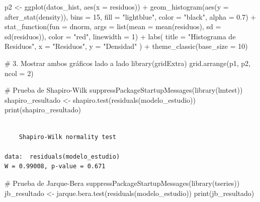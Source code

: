 \documentclass[
  letterpaper,
  DIV=11,
  numbers=noendperiod]{scrreprt}
\newenvironment{Shaded}{\begin{snugshade}}{\end{snugshade}}
\newcommand{\AttributeTok}[1]{\textcolor[rgb]{0.40,0.45,0.13}{#1}}
\newcommand{\CommentTok}[1]{\textcolor[rgb]{0.37,0.37,0.37}{#1}}
\newcommand{\DecValTok}[1]{\textcolor[rgb]{0.68,0.00,0.00}{#1}}
\newcommand{\FloatTok}[1]{\textcolor[rgb]{0.68,0.00,0.00}{#1}}
\newcommand{\FunctionTok}[1]{\textcolor[rgb]{0.28,0.35,0.67}{#1}}
\newcommand{\NormalTok}[1]{\textcolor[rgb]{0.00,0.23,0.31}{#1}}
\newcommand{\OtherTok}[1]{\textcolor[rgb]{0.00,0.23,0.31}{#1}}
\newcommand{\SpecialCharTok}[1]{\textcolor[rgb]{0.37,0.37,0.37}{#1}}
\newcommand{\StringTok}[1]{\textcolor[rgb]{0.13,0.47,0.30}{#1}}
\begin{document}
\begin{tcolorbox}
\begin{Shaded}
\begin{Highlighting}[]
\NormalTok{p2 }\OtherTok{\textless{}{-}} \FunctionTok{ggplot}\NormalTok{(datos\_hist, }\FunctionTok{aes}\NormalTok{(}\AttributeTok{x =}\NormalTok{ residuos)) }\SpecialCharTok{+}
  \FunctionTok{geom\_histogram}\NormalTok{(}\FunctionTok{aes}\NormalTok{(}\AttributeTok{y =} \FunctionTok{after\_stat}\NormalTok{(density)), }\AttributeTok{bins =} \DecValTok{15}\NormalTok{, }\AttributeTok{fill =} \StringTok{"lightblue"}\NormalTok{, }
                 \AttributeTok{color =} \StringTok{"black"}\NormalTok{, }\AttributeTok{alpha =} \FloatTok{0.7}\NormalTok{) }\SpecialCharTok{+}
  \FunctionTok{stat\_function}\NormalTok{(}\AttributeTok{fun =}\NormalTok{ dnorm, }
                \AttributeTok{args =} \FunctionTok{list}\NormalTok{(}\AttributeTok{mean =} \FunctionTok{mean}\NormalTok{(residuos), }\AttributeTok{sd =} \FunctionTok{sd}\NormalTok{(residuos)),}
                \AttributeTok{color =} \StringTok{"red"}\NormalTok{, }\AttributeTok{linewidth =} \DecValTok{1}\NormalTok{) }\SpecialCharTok{+}
  \FunctionTok{labs}\NormalTok{(}
    \AttributeTok{title =} \StringTok{"Histograma de Residuos"}\NormalTok{,}
    \AttributeTok{x =} \StringTok{"Residuos"}\NormalTok{,}
    \AttributeTok{y =} \StringTok{"Densidad"}
\NormalTok{  ) }\SpecialCharTok{+}
  \FunctionTok{theme\_classic}\NormalTok{(}\AttributeTok{base\_size =} \DecValTok{10}\NormalTok{)}

\CommentTok{\# 3. Mostrar ambos gráficos lado a lado}
\FunctionTok{library}\NormalTok{(gridExtra)}
\FunctionTok{grid.arrange}\NormalTok{(p1, p2, }\AttributeTok{ncol =} \DecValTok{2}\NormalTok{)}

\CommentTok{\# Prueba de Shapiro{-}Wilk}
\FunctionTok{suppressPackageStartupMessages}\NormalTok{(}\FunctionTok{library}\NormalTok{(lmtest))}
\NormalTok{shapiro\_resultado }\OtherTok{\textless{}{-}} \FunctionTok{shapiro.test}\NormalTok{(}\FunctionTok{residuals}\NormalTok{(modelo\_estudio))}
\FunctionTok{print}\NormalTok{(shapiro\_resultado)}
\end{Highlighting}
\end{Shaded}

\begin{verbatim}

    Shapiro-Wilk normality test

data:  residuals(modelo_estudio)
W = 0.99008, p-value = 0.671
\end{verbatim}

\begin{Shaded}
\begin{Highlighting}[]
\CommentTok{\# Prueba de Jarque{-}Bera}
\FunctionTok{suppressPackageStartupMessages}\NormalTok{(}\FunctionTok{library}\NormalTok{(tseries))}
\NormalTok{jb\_resultado }\OtherTok{\textless{}{-}} \FunctionTok{jarque.bera.test}\NormalTok{(}\FunctionTok{residuals}\NormalTok{(modelo\_estudio))}
\FunctionTok{print}\NormalTok{(jb\_resultado)}
\end{Highlighting}
\end{Shaded}


\end{tcolorbox}
\end{document}
